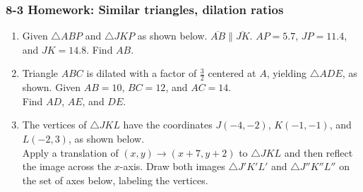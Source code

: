 \documentclass[12pt, twoside]{article}
\begin{document}
\subsubsection*{8-3 Homework: Similar triangles, dilation ratios}
 \begin{enumerate}

 \item Given $\triangle ABP$ and $\triangle JKP$ as shown below. $\overline{AB} \parallel \overline{JK}$. $AP=5.7$, $JP=11.4$, and $JK=14.8$. Find $AB$.
 \begin{center}
     \end{center}

     \vspace{2cm}

 \item Triangle $ABC$ is dilated with a factor of $\frac{3}{2}$ centered at $A$, yielding $\triangle ADE$, as shown. Given $AB=10$, $BC=12$, and $AC=14$. \\[0.25cm] Find $AD$, $AE$, and $DE$. \vspace{1cm}
 \begin{center}
   \end{center}



   \newpage

    \item The vertices of $\triangle JKL$ have the coordinates $J(-4,-2)$, $K(-1,-1)$, and $L(-2,3)$, as shown below. \\[0.5cm]
    Apply a translation of $(x,y) \rightarrow (x+7, y+2)$ to $\triangle JKL$ and then reflect the image across the $x$-axis. Draw both images $\triangle J'K'L'$ and $\triangle J''K''L''$ on the set of axes below, labeling the vertices.
    \begin{center}
\end{center}
\end{enumerate}
\end{document}

